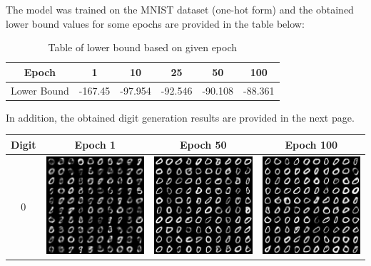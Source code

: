\documentclass[12pt,a4paper]{article}
\begin{document}
	\noindent The model was trained on the MNIST dataset (one-hot form) and the obtained lower bound values for some epochs are provided in the table below:
	\begin{table}[H]
		\centering
		\begin{tabular}{|c|c|c|c|c|c|}
			\hline
			Epoch & 1& 10& 25& 50& 100\\\hline
			Lower Bound & -167.45& -97.954& -92.546&-90.108& -88.361\\
			\hline
		\end{tabular}
	\caption{Table of lower bound based on given epoch}
	\end{table}

	\noindent In addition, the obtained digit generation results are provided in the next page.
	\newpage
	\begin{table}
		\centering
		\begin{tabular}{cccc}
			\toprule
			Digit & Epoch 1 & Epoch 50 & Epoch 100 \\
			\midrule
			0 & \includegraphics[width=4cm]{Figures/Epoch1_Label0} & \includegraphics[width=4cm]{Figures/Epoch50_Label0} & \includegraphics[width=4cm]{Figures/Epoch100_Label0}  \\

\end{tabular}
\end{table}
\end{document}
